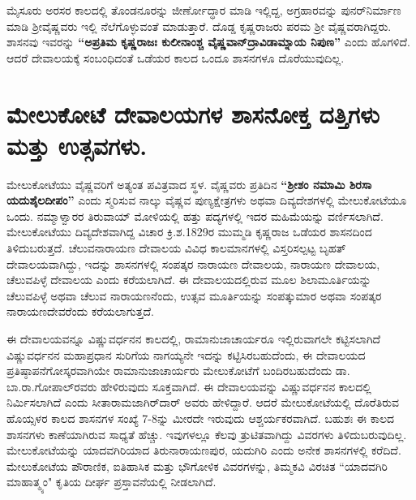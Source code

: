 ಮೈಸೂರು ಅರಸರ ಕಾಲದಲ್ಲಿ ತೊಂಡನೂರನ್ನು ಜೀರ್ಣೋದ್ಧಾರ ಮಾಡಿ ಇಲ್ಲಿದ್ದ, ಅಗ್ರಹಾರವನ್ನು ಪುನರ್​ ನಿರ್ಮಾಣ ಮಾಡಿ ಶ‍್ರೀವೈಷ್ಣವರು ಇಲ್ಲಿ ನೆಲೆಗೊಳ್ಳುವಂತೆ ಮಾಡುತ್ತಾರೆ. ದೊಡ್ಡ ಕೃಷ್ಣರಾಜರು ಪರಮ ಶ‍್ರೀ ವೈಷ್ಣವರಾಗಿದ್ದರು. ಶಾಸನವು ಇವರನ್ನು \textbf{“ಅಪ್ರತಿಮ ಕೃಷ್ಣರಾಜಃ ಕುಲೀನಾಂಶ್ಚ ವೈಷ್ಣವಾನ್​ ದ್ರಾವಿಡಾಮ್ನಾಯ ನಿಪುಣ”} ಎಂದು ಹೊಗಳಿದೆ. ಆದರೆ ದೇವಾಲಯಕ್ಕೆ ಸಂಬಂಧಿದಂತೆ ಒಡೆಯರ ಕಾಲದ ಒಂದೂ ಶಾಸನಗಳೂ ದೊರೆಯುವುದಿಲ್ಲ.


\section*{ಮೇಲುಕೋಟೆ ದೇವಾಲಯಗಳ ಶಾಸನೋಕ್ತ ದತ್ತಿಗಳು ಮತ್ತು ಉತ್ಸವಗಳು.}

ಮೇಲುಕೋಟೆಯು ವೈಷ್ಣವರಿಗೆ ಅತ್ಯಂತ ಪವಿತ್ರವಾದ ಸ್ಥಳ. ವೈಷ್ಣವರು ಪ್ರತಿದಿನ \textbf{“ಶ‍್ರೀಶಂ ನಮಾಮಿ ಶಿರಸಾ ಯದುಶೈಲ\-ದೀಪಂ”} ಎಂದು ಸ್ಮರಿಸುವ ನಾಲ್ಕು ವೈಷ್ಣವ ಪುಣ್ಯಕ್ಷೇತ್ರಗಳು ಅಥವಾ ದಿವ್ಯದೇಶಗಳಲ್ಲಿ ಮೇಲುಕೋಟೆಯೂ ಒಂದು. ನಮ್ಮಾಳ್ವಾರರ ತಿರುವಾಯ್​ ಮೋಳಿಯಲ್ಲಿ ಹತ್ತು ಪದ್ಯಗಳಲ್ಲಿ ಇದರ ಮಹಿಮೆಯನ್ನು ವರ್ಣಿಸಲಾಗಿದೆ. ಮೇಲುಕೋಟೆಯು ದಿವ್ಯದೇಶವಾಗಿದ್ದ ವಿಚಾರ ಕ್ರಿ.ಶ.1829ರ ಮುಮ್ಮಡಿ ಕೃಷ್ಣರಾಜ ಒಡೆಯರ ಶಾಸನದಿಂದ ತಿಳಿದುಬರುತ್ತದೆ. ಚೆಲುವ\-ನಾರಾಯಣ ದೇವಾಲಯ ವಿವಿಧ ಕಾಲಮಾನಗಳಲ್ಲಿ ವಿಸ್ತರಿಸಲ್ಪಟ್ಟ ಬೃಹತ್​ ದೇವಾಲಯವಾಗಿದ್ದು, ಇದನ್ನು ಶಾಸನಗಳಲ್ಲಿ ಸಂಪತ್ಕರ ನಾರಾಯಣ ದೇವಾಲಯ, ನಾರಾಯಣ ದೇವಾಲಯ, ಚೆಲುವಪಿಳ್ಳೆ ದೇವಾಲಯ ಎಂದು ಕರೆಯಲಾಗಿದೆ. ಈ ದೇವಾಲಯದಲ್ಲಿರುವ ಮೂಲ ಶಿಲಾಮೂರ್ತಿಯನ್ನು ಚೆಲುವಪಿಳ್ಳೆ ಅಥವಾ ಚೆಲುವ ನಾರಾಯಣನೆಂದು, ಉತ್ಸವ ಮೂರ್ತಿಯನ್ನು ಸಂಪತ್ಕುಮಾರ ಅಥವಾ ಸಂಪತ್ಕರ ನಾರಾಯಣದೇವರೆಂದು ಕರೆಯಲಾಗುತ್ತದೆ.

ಈ ದೇವಾಲಯವನ್ನೂ ವಿಷ್ಣುವರ್ಧನನ ಕಾಲದಲ್ಲಿ, ರಾಮಾನುಜಾಚಾರ್ಯರೂ ಇಲ್ಲಿರುವಾಗಲೇ ಕಟ್ಟಿಸಲಾಗಿದೆ ವಿಷ್ಣುವರ್ಧನನ ಮಹಾಪ್ರಧಾನ ಸುರಿಗೆಯ ನಾಗಯ್ಯನೇ ಇದನ್ನು ಕಟ್ಟಿಸಿರಬಹುದೆಂದು, ಈ ದೇವಾಲಯದ ಪ್ರತಿಷ್ಠಾಪನೆ\-ಗೋಸ್ಕರವಾಗಿಯೇ ರಾಮಾನುಜಾಚಾರ್ಯರು ಮೇಲುಕೋಟೆಗೆ ಬಂದಿರಬಹುದೆಂದು ಡಾ. ಬಾ.ರಾ.ಗೋಪಾಲ್​ರವರು ಹೇಳಿರುವುದು ಸೂಕ್ತವಾಗಿದೆ. ಈ ದೇವಾಲಯವನ್ನು ವಿಷ್ಣುವರ್ಧನನ ಕಾಲದಲ್ಲಿ ನಿರ್ಮಿಸಲಾಗಿದೆ ಎಂದು ಸೀತಾರಾಮ\break ಜಾಗಿರ್​ದಾರ್​ ಅವರು ಹೇಳಿದ್ದಾರೆ. ಆದರೆ ಮೇಲುಕೋಟೆಯಲ್ಲಿ ದೊರೆತಿರುವ ಹೊಯ್ಸಳರ ಕಾಲದ ಶಾಸನಗಳ ಸಂಖ್ಯೆ 7-8ನ್ನು ಮೀರದೇ ಇರುವುದು ಆಶ್ಚರ್ಯಕರವಾಗಿದೆ. ಬಹುಶಃ ಈ ಕಾಲದ ಶಾಸನಗಳು ಕಾಣೆಯಾಗಿರುವ ಸಾಧ್ಯತೆ ಹೆಚ್ಚು. ಇವುಗಳಲ್ಲೂ ಕೆಲವು ತ್ರುಟಿತವಾಗಿದ್ದು ವಿವರಗಳು ತಿಳಿದುಬರುವುದಿಲ್ಲ. ಮೇಲುಕೋಟೆಯನ್ನು ಯಾದವಗಿರಿಯಾದ ತಿರುನಾರಾಯಣಪುರ, ಯದುಗಿರಿ ಎಂದು ಅನೇಕ ಶಾಸನಗಳಲ್ಲಿ ಕರೆದಿದೆ. ಮೇಲುಕೋಟೆಯ ಪೌರಾಣಿಕ, ಐತಿಹಾಸಿಕ ಮತ್ತು ಭೌಗೋಳಿಕ ವಿವರಗಳನ್ನು, ತಿಮ್ಮಕವಿ ವಿರಚಿತ “ಯಾದವಗಿರಿ ಮಾಹಾತ್ಮ್ಯಂ" ಕೃತಿಯ ದೀರ್ಘ ಪ್ರಸ್ತಾವನೆಯಲ್ಲಿ ನೀಡಲಾಗಿದೆ.


